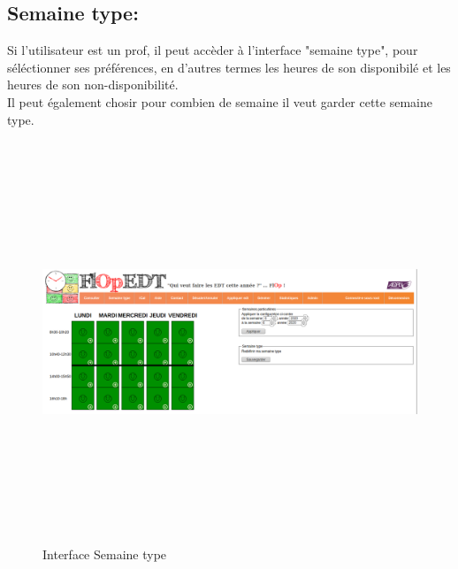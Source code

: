 \subsection*{Semaine type:}
Si l'utilisateur est un prof, il peut accèder à l'interface "semaine type", pour séléctionner ses préférences, en d'autres termes les heures de son disponibilé et les heures de son non-disponibilité. \\
Il peut également chosir pour combien de semaine il veut garder cette semaine type.
\begin{figure}[H]
      \centering
        \includegraphics[width=14cm,height=12cm]{img/2.png}
        \caption{Interface Semaine type}
\end{figure}
\newpage
